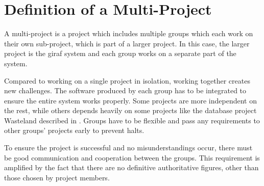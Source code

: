 \section{Definition of a Multi-Project}
\label{sec:multiproject}
A multi-project is a project which includes multiple groups which each work on their own sub-project, which is part of a larger project. In this case, the larger project is the \ac{giraf} system and each group works on a separate part of the system.

Compared to working on a single project in isolation, working together creates new challenges. The software produced by each group has to be integrated to ensure the entire system works properly. Some projects are more independent on the rest, while others depends heavily on some projects like the database project Wasteland described in . Groups have to be flexible and pass any requirements to other groups' projects early to prevent halts.

To ensure the project is successful and no misunderstandings occur, there must be good communication and cooperation between the groups. This requirement is amplified by the fact that there are no definitive authoritative figures, other than those chosen by project members.
